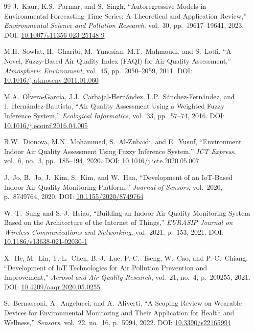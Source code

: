 \documentclass[12pt,a4paper]{report}
\begin{document}
\begin{thebibliography}{99}
J.~Kaur, K.S.~Parmar, and S.~Singh,
``Autoregressive Models in Environmental Forecasting Time Series: A Theoretical and Application Review,''
\textit{Environmental Science and Pollution Research}, vol.~30, pp.~19617--19641, 2023.
DOI: \href{https://doi.org/10.1007/s11356-023-25148-9}{10.1007/s11356-023-25148-9}

M.H.~Sowlat, H.~Gharibi, M.~Yunesian, M.T.~Mahmoudi, and S.~Lotfi,
``A Novel, Fuzzy-Based Air Quality Index (FAQI) for Air Quality Assessment,''
\textit{Atmospheric Environment}, vol.~45, pp.~2050--2059, 2011.
DOI: \href{https://doi.org/10.1016/j.atmosenv.2011.01.060}{10.1016/j.atmosenv.2011.01.060}

M.A.~Olvera-Garc\'{i}a, J.J.~Carbajal-Hern\'{a}ndez, L.P.~S\'{a}nchez-Fern\'{a}ndez, and I.~Hern\'{a}ndez-Bautista,
``Air Quality Assessment Using a Weighted Fuzzy Inference System,''
\textit{Ecological Informatics}, vol.~33, pp.~57--74, 2016.
DOI: \href{https://doi.org/10.1016/j.ecoinf.2016.04.005}{10.1016/j.ecoinf.2016.04.005}

B.W.~Dionova, M.N.~Mohammed, S.~Al-Zubaidi, and E.~Yusuf,
``Environment Indoor Air Quality Assessment Using Fuzzy Inference System,''
\textit{ICT Express}, vol.~6, no.~3, pp.~185--194, 2020.
DOI: \href{https://doi.org/10.1016/j.icte.2020.05.007}{10.1016/j.icte.2020.05.007}

J.~Jo, B.~Jo, J.~Kim, S.~Kim, and W.~Han,
``Development of an IoT-Based Indoor Air Quality Monitoring Platform,''
\textit{Journal of Sensors}, vol.~2020, p.~8749764, 2020.
DOI: \href{https://doi.org/10.1155/2020/8749764}{10.1155/2020/8749764}

W.-T.~Sung and S.-J.~Hsiao,
``Building an Indoor Air Quality Monitoring System Based on the Architecture of the Internet of Things,''
\textit{EURASIP Journal on Wireless Communications and Networking}, vol.~2021, p.~153, 2021.
DOI: \href{https://doi.org/10.1186/s13638-021-02030-1}{10.1186/s13638-021-02030-1}

X.~He, M.~Lin, T.-L.~Chen, B.-J.~Lue, P.-C.~Tseng, W.~Cao, and P.-C.~Chiang,
``Development of IoT Technologies for Air Pollution Prevention and Improvement,''
\textit{Aerosol and Air Quality Research}, vol.~21, no.~4, p.~200255, 2021.
DOI: \href{https://doi.org/10.4209/aaqr.2020.05.0255}{10.4209/aaqr.2020.05.0255}

S.~Bernasconi, A.~Angelucci, and A.~Aliverti,
``A Scoping Review on Wearable Devices for Environmental Monitoring and Their Application for Health and Wellness,''
\textit{Sensors}, vol.~22, no.~16, p.~5994, 2022.
DOI: \href{https://doi.org/10.3390/s22165994}{10.3390/s22165994}


\end{thebibliography}
\end{document}
